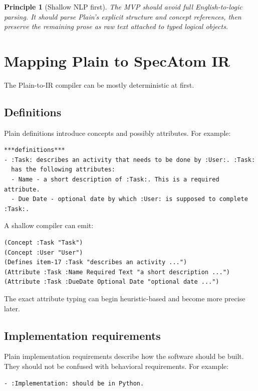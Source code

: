 \documentclass[11pt]{article}
\newtheorem{principle}{Principle}
\begin{document}
\begin{principle}[Shallow NLP first]
The MVP should avoid full English-to-logic parsing. It should parse Plain's
explicit structure and concept references, then preserve the remaining prose as
raw text attached to typed logical objects.
\end{principle}

\section{Mapping Plain to SpecAtom IR}

The Plain-to-IR compiler can be mostly deterministic at first.

\subsection{Definitions}

Plain definitions introduce concepts and possibly attributes. For example:

\begin{verbatim}
***definitions***
- :Task: describes an activity that needs to be done by :User:. :Task:
  has the following attributes:
  - Name - a short description of :Task:. This is a required attribute.
  - Due Date - optional date by which :User: is supposed to complete :Task:.
\end{verbatim}

A shallow compiler can emit:

\begin{verbatim}
(Concept :Task "Task")
(Concept :User "User")
(Defines item-17 :Task "describes an activity ...")
(Attribute :Task :Name Required Text "a short description ...")
(Attribute :Task :DueDate Optional Date "optional date ...")
\end{verbatim}

The exact attribute typing can begin heuristic-based and become more precise
later.

\subsection{Implementation requirements}

Plain implementation requirements describe how the software should be built.
They should not be confused with behavioral requirements. For example:

\begin{verbatim}
- :Implementation: should be in Python.
\end{verbatim}
\end{document}
